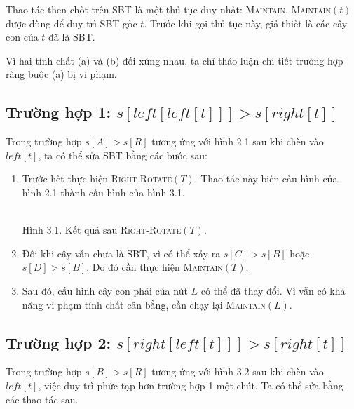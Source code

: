 \documentclass[11pt]{article}
\newcommand{\sbtleafat}[2]{%
  \begin{scope}[shift={(#1)}]
    \draw[sbt leaf] (0,0.42)--(-0.45,-0.32)--(0.45,-0.32)--cycle;
    \node[font=\small] at (0,-0.02) {$#2$};
  \end{scope}%
}
\begin{document}
Thao tác then chốt trên SBT là một thủ tục duy nhất: \textsc{Maintain}.
\textsc{Maintain}$(t)$ được dùng để duy trì SBT gốc $t$. Trước khi gọi thủ
tục này, giả thiết là các cây con của $t$ đã là SBT.

Vì hai tính chất (a) và (b) đối xứng nhau, ta chỉ thảo luận chi tiết trường
hợp ràng buộc (a) bị vi phạm.

\subsection*{Trường hợp 1: $s[\mathit{left}[\mathit{left}[t]]]>s[\mathit{right}[t]]$}

Trong trường hợp $s[A]>s[R]$ tương ứng với hình 2.1 sau khi chèn vào
$\mathit{left}[t]$, ta có thể sửa SBT bằng các bước sau:

\begin{enumerate}
  \item Trước hết thực hiện \textsc{Right-Rotate}$(T)$. Thao tác này biến cấu
  hình của hình 2.1 thành cấu hình của hình 3.1.
\begin{center}
\\[-0.2em]
{\small Hình 3.1. Kết quả sau \textsc{Right-Rotate}$(T)$.}
\end{center}
  \item Đôi khi cây vẫn chưa là SBT, vì có thể xảy ra $s[C]>s[B]$ hoặc
  $s[D]>s[B]$. Do đó cần thực hiện \textsc{Maintain}$(T)$.
  \item Sau đó, cấu hình cây con phải của nút $L$ có thể đã thay đổi. Vì vẫn
  có khả năng vi phạm tính chất cân bằng, cần chạy lại \textsc{Maintain}$(L)$.
\end{enumerate}

\subsection*{Trường hợp 2: $s[\mathit{right}[\mathit{left}[t]]]>s[\mathit{right}[t]]$}

Trong trường hợp $s[B]>s[R]$ tương ứng với hình 3.2 sau khi chèn vào
$\mathit{left}[t]$, việc duy trì phức tạp hơn trường hợp 1 một chút. Ta có
thể sửa bằng các thao tác sau.
\end{document}
